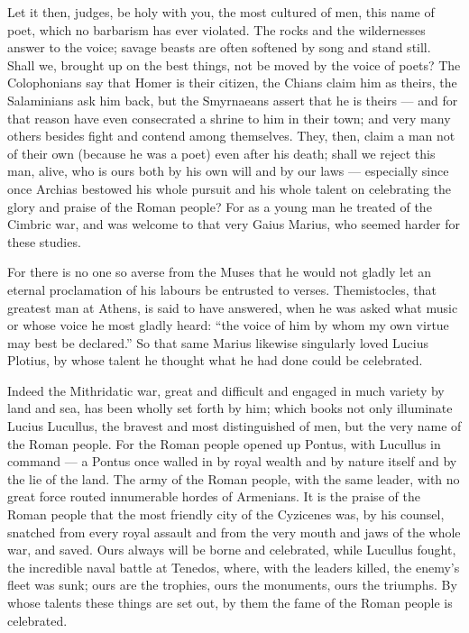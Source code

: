  Let it then, judges, be holy with you, the most cultured of men, this name of poet, which no barbarism has ever violated. The rocks and the wildernesses answer to the voice; savage beasts are often softened by song and stand still. Shall we, brought up on the best things, not be moved by the voice of poets? The Colophonians say that Homer is their citizen, the Chians claim him as theirs, the Salaminians ask him back, but the Smyrnaeans assert that he is theirs --- and for that reason have even consecrated a shrine to him in their town; and very many others besides fight and contend among themselves. They, then, claim a man not of their own (because he was a poet) even after his death; shall we reject this man, alive, who is ours both by his own will and by our laws --- especially since once Archias bestowed his whole pursuit and his whole talent on celebrating the glory and praise of the Roman people? For as a young man he treated of the Cimbric war, and was welcome to that very Gaius Marius, who seemed harder for these studies.

 For there is no one so averse from the Muses that he would not gladly let an eternal proclamation of his labours be entrusted to verses. Themistocles, that greatest man at Athens, is said to have answered, when he was asked what music or whose voice he most gladly heard: ``the voice of him by whom my own virtue may best be declared.'' So that same Marius likewise singularly loved Lucius Plotius, by whose talent he thought what he had done could be celebrated.

 Indeed the Mithridatic war, great and difficult and engaged in much variety by land and sea, has been wholly set forth by him; which books not only illuminate Lucius Lucullus, the bravest and most distinguished of men, but the very name of the Roman people. For the Roman people opened up Pontus, with Lucullus in command --- a Pontus once walled in by royal wealth and by nature itself and by the lie of the land. The army of the Roman people, with the same leader, with no great force routed innumerable hordes of Armenians. It is the praise of the Roman people that the most friendly city of the Cyzicenes was, by his counsel, snatched from every royal assault and from the very mouth and jaws of the whole war, and saved. Ours always will be borne and celebrated, while Lucullus fought, the incredible naval battle at Tenedos, where, with the leaders killed, the enemy's fleet was sunk; ours are the trophies, ours the monuments, ours the triumphs. By whose talents these things are set out, by them the fame of the Roman people is celebrated.

